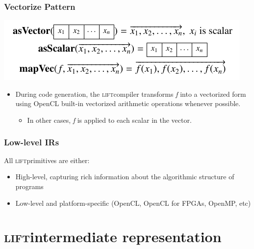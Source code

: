 \documentclass[10pt]{beamer}
\newcommand{\lift}{\textsc{lift}\space}
\begin{document}
\begin{frame}
\frametitle{Vectorize Pattern}
    \begin{block}{}
        \begin{center}
            \includegraphics[width=.85\textwidth]{../images/vectorize_pattern.pdf}
        \end{center}
    \end{block}
\begin{itemize}
    \item During code generation, the \lift compiler transforms \textit{f} into a vectorized form using OpenCL built-in vectorized arithmetic operations whenever possible.
	\begin{itemize}
	    \item In other cases, \textit{f} is applied to each scalar in the vector.
    \end{itemize}
\end{itemize}
\end{frame}

\begin{frame}
\frametitle{Low-level IRs}
All \lift primitives are either:
\begin{itemize}
	\item High-level, capturing rich information about the algorithmic structure of programs
	\item Low-level and platform-specific (OpenCL, OpenCL for FPGAs, OpenMP, etc)
\end{itemize}
\end{frame}

\section{\lift intermediate representation}
\end{document}
